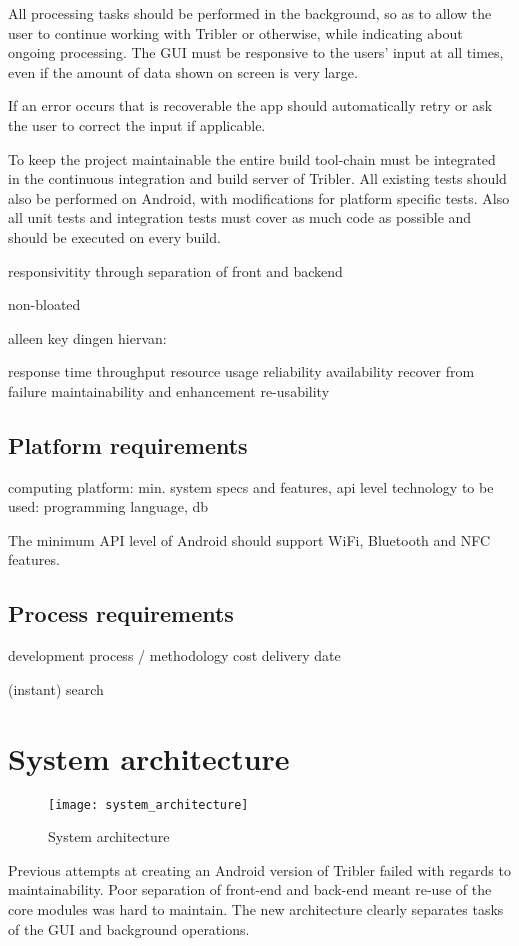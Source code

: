 All processing tasks should be performed in the background, so as to allow the user to continue working with Tribler or otherwise, while indicating about ongoing processing.
The GUI must be responsive to the users' input at all times, even if the amount of data shown on screen is very large.

If an error occurs that is recoverable the app should automatically retry or ask the user to correct the input if applicable.

To keep the project maintainable the entire build tool-chain must be integrated in the continuous integration and build server of Tribler.
All existing tests should also be performed on Android, with modifications for platform specific tests.
Also all unit tests and integration tests must cover as much code as possible and should be executed on every build.


responsivitity through separation of front and backend


non-bloated

alleen key dingen hiervan:

response time
throughput
resource usage
reliability
availability
recover from failure
maintainability and enhancement
re-usability

\subsection{Platform requirements}

computing platform: min. system specs and features, api level
technology to be used: programming language, db

The minimum API level of Android should support WiFi, Bluetooth and NFC features.



\subsection{Process requirements}

development process / methodology
cost
delivery date




(instant) search





\section{System architecture}


\begin{figure}[h]
	\centering
	\texttt{[image: system\_architecture]}
	\caption{System architecture}
	\label{fig:system_architecture}
\end{figure}


Previous attempts at creating an Android version of Tribler failed with regards to maintainability.
Poor separation of front-end and back-end meant re-use of the core modules was hard to maintain.
The new architecture clearly separates tasks of the GUI and background operations.


